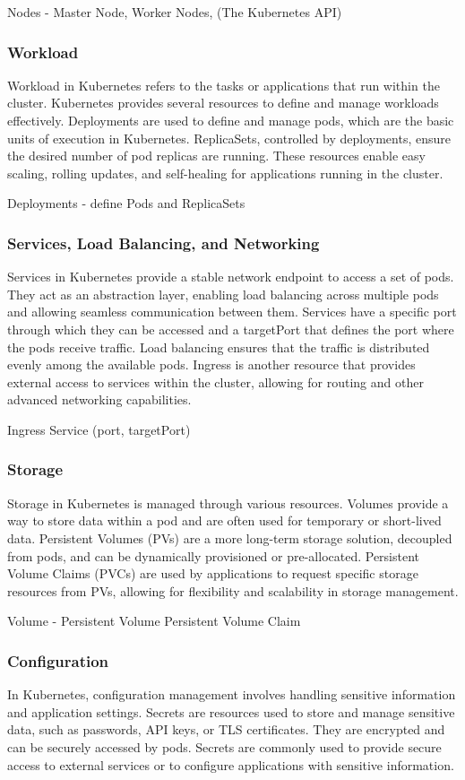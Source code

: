 \documentclass{article}
\begin{document}
Nodes - Master Node, Worker Nodes, (The Kubernetes API)
\subsubsection*{Workload}
Workload in Kubernetes refers to the tasks or applications that run within the cluster. Kubernetes provides several resources to define and manage workloads effectively. Deployments are used to define and manage pods, which are the basic units of execution in Kubernetes. ReplicaSets, controlled by deployments, ensure the desired number of pod replicas are running. These resources enable easy scaling, rolling updates, and self-healing for applications running in the cluster.


Deployments - define Pods and ReplicaSets
\subsubsection*{Services, Load Balancing, and Networking}
Services in Kubernetes provide a stable network endpoint to access a set of pods. They act as an abstraction layer, enabling load balancing across multiple pods and allowing seamless communication between them. Services have a specific port through which they can be accessed and a targetPort that defines the port where the pods receive traffic. Load balancing ensures that the traffic is distributed evenly among the available pods. Ingress is another resource that provides external access to services within the cluster, allowing for routing and other advanced networking capabilities.

Ingress
Service (port, targetPort)
\subsubsection*{Storage}
Storage in Kubernetes is managed through various resources. Volumes provide a way to store data within a pod and are often used for temporary or short-lived data. Persistent Volumes (PVs) are a more long-term storage solution, decoupled from pods, and can be dynamically provisioned or pre-allocated. Persistent Volume Claims (PVCs) are used by applications to request specific storage resources from PVs, allowing for flexibility and scalability in storage management.


Volume - Persistent Volume
Persistent Volume Claim
\subsubsection*{Configuration}
In Kubernetes, configuration management involves handling sensitive information and application settings. Secrets are resources used to store and manage sensitive data, such as passwords, API keys, or TLS certificates. They are encrypted and can be securely accessed by pods. Secrets are commonly used to provide secure access to external services or to configure applications with sensitive information.
\end{document}
